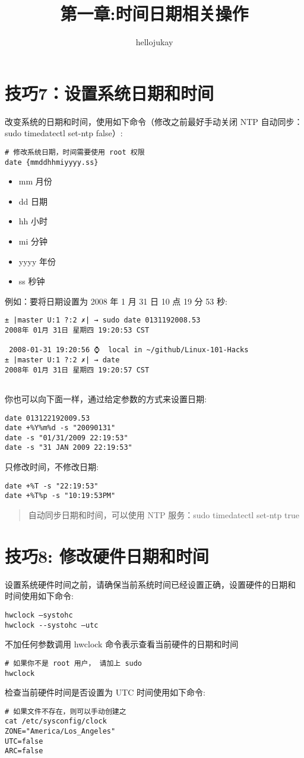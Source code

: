 \documentclass[UTF8]{ctexart}
\title{第一章:时间日期相关操作}
\author{hellojukay}
\begin{document}
\section*{技巧7：设置系统日期和时间}

改变系统的日期和时间，使用如下命令（修改之前最好手动关闭 NTP 自动同步：sudo timedatectl set-ntp false）:
\begin{lstlisting}
# 修改系统日期，时间需要使用 root 权限
date {mmddhhmiyyyy.ss}
\end{lstlisting}
\begin{itemize}
    \item mm 月份
    \item dd 日期
    \item hh 小时
    \item mi 分钟
    \item yyyy 年份
    \item ss 秒钟
\end{itemize}
例如：要将日期设置为 2008 年 1 月 31 日 10 点
19 分 53 秒:
\begin{lstlisting}
± |master U:1 ?:2 ✗| → sudo date 0131192008.53                                                                                                                               
2008年 01月 31日 星期四 19:20:53 CST

 2008-01-31 19:20:56 ⌚  local in ~/github/Linux-101-Hacks
± |master U:1 ?:2 ✗| → date
2008年 01月 31日 星期四 19:20:57 CST
    
\end{lstlisting}
你也可以向下面一样，通过给定参数的方式来设置日期:
\begin{lstlisting}
date 013122192009.53
date +%Y%m%d -s "20090131"
date -s "01/31/2009 22:19:53"
date -s "31 JAN 2009 22:19:53"
\end{lstlisting}
只修改时间，不修改日期:
\begin{lstlisting}
date +%T -s "22:19:53"
date +%T%p -s "10:19:53PM"
\end{lstlisting}

\begin{quote}
    \small{自动同步日期和时间，可以使用 NTP 服务：sudo timedatectl set-ntp true}
\end{quote}


\section*{技巧8: 修改硬件日期和时间}

设置系统硬件时间之前，请确保当前系统时间已经设置正确，设置硬件的日期和
时间使用如下命令:
\begin{lstlisting}
hwclock –systohc
hwclock --systohc –utc
\end{lstlisting}
不加任何参数调用 hwclock 命令表示查看当前硬件的日期和时间
\begin{lstlisting}
# 如果你不是 root 用户， 请加上 sudo 
hwclock
\end{lstlisting}
检查当前硬件时间是否设置为 UTC 时间使用如下命令:
\begin{lstlisting}
# 如果文件不存在，则可以手动创建之
cat /etc/sysconfig/clock
ZONE="America/Los_Angeles"
UTC=false
ARC=false
\end{lstlisting}
\end{document}
